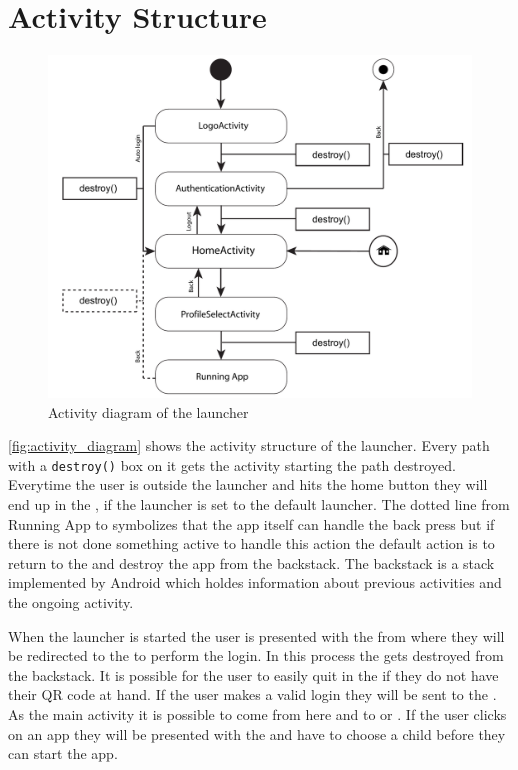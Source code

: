 \section{Activity Structure}
\label{implementation:activity_structure}
\begin{figure}[h!]
	\centering
	\includegraphics[width=1\textwidth]{gfx/activityDiagram.pdf}
	\caption{Activity diagram of the launcher}
	\label{fig:activity_diagram}
\end{figure}
\autoref{fig:activity_diagram} shows the activity structure of the \giraf[] launcher. Every path with a \verb+destroy()+ box on it gets the activity starting the path destroyed. Everytime the user is outside the launcher and hits the home button they will end up in the , if the \giraf[] launcher is set to the default launcher.
The dotted line from Running App to  symbolizes that the app itself can handle the back press but if there is not done something active to handle this action the default action is to return to the  and destroy the app from the backstack. The backstack is a stack implemented by Android which holdes information about previous activities and the ongoing activity.

When the launcher is started the user is presented with the  from where they will be redirected to the  to perform the login. In this process the  gets destroyed from the backstack.
It is possible for the user to easily quit in the  if they do not have their QR code at hand. If the user makes a valid login they will be sent to the . As the main activity it is possible to come from here and to  or . If the user clicks on an app they will be presented with the  and have to choose a child before they can start the app.


